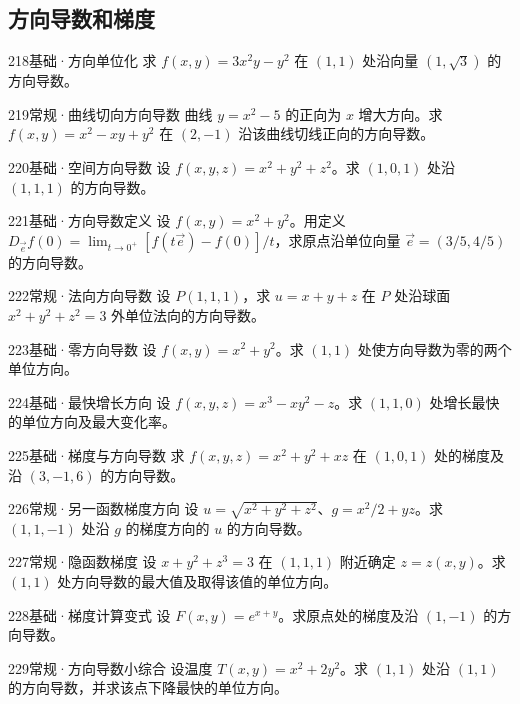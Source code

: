 \subsection{方向导数和梯度}
\begin{exercise}{218}{基础·方向单位化}
求 $f(x,y)=3x^2y-y^2$ 在 $(1,1)$ 处沿向量 $(1,\sqrt3)$ 的方向导数。
\end{exercise}
\begin{exercise}{219}{常规·曲线切向方向导数}
曲线 $y=x^2-5$ 的正向为 $x$ 增大方向。求 $f(x,y)=x^2-xy+y^2$ 在 $(2,-1)$ 沿该曲线切线正向的方向导数。
\end{exercise}
\begin{exercise}{220}{基础·空间方向导数}
设 $f(x,y,z)=x^2+y^2+z^2$。求 $(1,0,1)$ 处沿 $(1,1,1)$ 的方向导数。
\end{exercise}
\begin{exercise}{221}{基础·方向导数定义}
设 $f(x,y)=x^2+y^2$。用定义 $D_{\vec e}f(0)=\lim_{t\to0^+}[f(t\vec e)-f(0)]/t$，求原点沿单位向量 $\vec e=(3/5,4/5)$ 的方向导数。
\end{exercise}
\begin{exercise}{222}{常规·法向方向导数}
设 $P(1,1,1)$，求 $u=x+y+z$ 在 $P$ 处沿球面 $x^2+y^2+z^2=3$ 外单位法向的方向导数。
\end{exercise}
\begin{exercise}{223}{基础·零方向导数}
设 $f(x,y)=x^2+y^2$。求 $(1,1)$ 处使方向导数为零的两个单位方向。
\end{exercise}
\begin{exercise}{224}{基础·最快增长方向}
设 $f(x,y,z)=x^3-xy^2-z$。求 $(1,1,0)$ 处增长最快的单位方向及最大变化率。
\end{exercise}
\begin{exercise}{225}{基础·梯度与方向导数}
求 $f(x,y,z)=x^2+y^2+xz$ 在 $(1,0,1)$ 处的梯度及沿 $(3,-1,6)$ 的方向导数。
\end{exercise}
\begin{exercise}{226}{常规·另一函数梯度方向}
设 $u=\sqrt{x^2+y^2+z^2}$、$g=x^2/2+yz$。求 $(1,1,-1)$ 处沿 $g$ 的梯度方向的 $u$ 的方向导数。
\end{exercise}
\begin{exercise}{227}{常规·隐函数梯度}
设 $x+y^2+z^3=3$ 在 $(1,1,1)$ 附近确定 $z=z(x,y)$。求 $(1,1)$ 处方向导数的最大值及取得该值的单位方向。
\end{exercise}
\begin{exercise}{228}{基础·梯度计算变式}
设 $F(x,y)=e^{x+y}$。求原点处的梯度及沿 $(1,-1)$ 的方向导数。
\end{exercise}
\begin{exercise}{229}{常规·方向导数小综合}
设温度 $T(x,y)=x^2+2y^2$。求 $(1,1)$ 处沿 $(1,1)$ 的方向导数，并求该点下降最快的单位方向。
\end{exercise}
